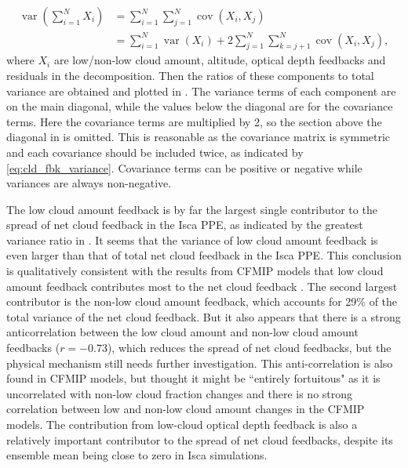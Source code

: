 \begin{equation}
    \begin{aligned}
    \operatorname{var}\left(\sum_{i=1}^{N} X_{i}\right) &=\sum_{i=1}^{N} \sum_{j=1}^{N} \operatorname{cov}\left(X_{i}, X_{j}\right) \\
    &=\sum_{i=1}^{N} \operatorname{var}\left(X_{i}\right)+2 \sum_{j=1}^{N} \sum_{k=j+1}^{N} \operatorname{cov}\left(X_{i}, X_{j}\right),
    \end{aligned}
    \label{eq:cld_fbk_variance}
\end{equation}
where $X_i$ are low/non-low cloud amount, altitude, optical depth feedbacks and residuals in the decomposition. Then the ratios of these components to total variance are obtained and plotted in . The variance terms of each component are on the main diagonal, while the values below the diagonal are for the covariance terms. Here the covariance terms are multiplied by 2, so the section above the diagonal in  is omitted. This is reasonable as the covariance matrix is symmetric and each covariance should be included twice, as indicated by \eqref{eq:cld_fbk_variance}. Covariance terms can be positive or negative while variances are always non-negative.

The low cloud amount feedback is by far the largest single contributor to the spread of net cloud feedback in the Isca PPE, as indicated by the greatest variance ratio in . It seems that the variance of low cloud amount feedback is even larger than that of total net cloud feedback in the Isca PPE. This conclusion is qualitatively consistent with the results from CFMIP models that low cloud amount feedback contributes most to the net cloud feedback \citep[][]{Zelinka2016insights}. The second largest contributor is the non-low cloud amount feedback, which accounts for 29\% of the total variance of the net cloud feedback. But it also appears that there is a strong anticorrelation between the low cloud amount and non-low cloud amount feedbacks ($r=-0.73$), which reduces the spread of net cloud feedbacks, but the physical mechanism still needs further investigation. This anti-correlation is also found in CFMIP models, but \cite{Zelinka2016insights} thought it might be ``entirely fortuitous" as it is uncorrelated with non-low cloud fraction changes and there is no strong correlation between low and non-low cloud amount changes in the CFMIP models. The contribution from low-cloud optical depth feedback is also a relatively important contributor to the spread of net cloud feedbacks, despite its ensemble mean being close to zero in Isca simulations.

